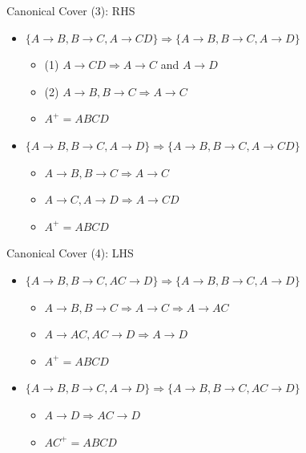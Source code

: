 \documentclass[aspectratio=169, xcolor=dvipsnames]{beamer}
\begin{document}
\begin{frame}{Canonical Cover (3): RHS}
    \begin{itemize}[<+->]
        \item $\{A \rightarrow B, B \rightarrow C, A \rightarrow CD\} \Rightarrow \{A \rightarrow B, B \rightarrow C, A \rightarrow D\}$
        \begin{itemize}
            \item[$\triangleright$] (1) $A \rightarrow CD \Rightarrow A \rightarrow C$ and $A \rightarrow D$
            \item[$\triangleright$] (2) $A \rightarrow B, B \rightarrow C \Rightarrow A \rightarrow C$
            \item[$\triangleright$] $A^+ = ABCD$
        \end{itemize}
        \item $\{A \rightarrow B, B \rightarrow C, A \rightarrow D\} \Rightarrow \{A \rightarrow B, B \rightarrow C, A \rightarrow CD\}$
        \begin{itemize}
            \item[$\triangleright$] $A \rightarrow B, B \rightarrow C \Rightarrow A \rightarrow C$
            \item[$\triangleright$] $A \rightarrow C, A \rightarrow D \Rightarrow A \rightarrow CD$
            \item[$\triangleright$] $A^+ = ABCD$
        \end{itemize}
    \end{itemize}
\end{frame}

\begin{frame}{Canonical Cover (4): LHS}
    \begin{itemize}[<+->]
        \item $\{A \rightarrow B, B \rightarrow C, AC \rightarrow D\} \Rightarrow \{A \rightarrow B, B \rightarrow C, A \rightarrow D\}$
        \begin{itemize}
            \item[$\triangleright$] $A \rightarrow B, B \rightarrow C \Rightarrow A \rightarrow C \Rightarrow A \rightarrow AC$
            \item[$\triangleright$] $A \rightarrow AC, AC \rightarrow D \Rightarrow A \rightarrow D$
            \item[$\triangleright$] $A^+ = ABCD$
        \end{itemize}
        \item $\{A \rightarrow B, B \rightarrow C, A \rightarrow D\} \Rightarrow \{A \rightarrow B, B \rightarrow C, AC \rightarrow D\}$
        \begin{itemize}
            \item[$\triangleright$] $A \rightarrow D \Rightarrow AC \rightarrow D$
            \item[$\triangleright$] $AC^+ = ABCD$
        \end{itemize}
    \end{itemize}
\end{frame}
\end{document}
